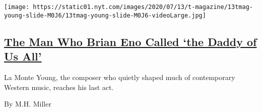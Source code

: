 \begin{enumerate}
  \texttt{[image: https://static01.nyt.com/images/2020/07/13/t-magazine/13tmag-young-slide-M0J6/13tmag-young-slide-M0J6-videoLarge.jpg]}

  \hypertarget{the-man-who-brian-eno-called-the-daddy-of-us-all}{%
  \subsection{\texorpdfstring{\href{/2020/07/22/t-magazine/la-monte-young.html}{The
  Man Who Brian Eno Called `the Daddy of Us
  All'}}{The Man Who Brian Eno Called `the Daddy of Us All'}}\label{the-man-who-brian-eno-called-the-daddy-of-us-all}}

  La Monte Young, the composer who quietly shaped much of contemporary
  Western music, reaches his last act.

  By M.H. Miller
\end{enumerate}

